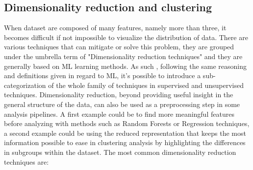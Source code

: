\subsection{Dimensionality reduction and clustering}
When dataset are composed of many features, namely more than three, it becomes difficult if not impossible to visualize the distribution of data. There are various techniques that can mitigate or solve this problem, they are grouped under the umbrella term of "Dimensionality reduction techniques" and they are generally based on ML learning methods. As such , following the same reasoning and definitions given in regard to ML, it's possible to introduce a sub-categorization of the whole family of techniques in supervised and unsupervised techniques. Dimensionality reduction, beyond providing useful insight in the general structure of the data, can also be used as a preprocessing step in some analysis pipelines. A first example could be to find more meaningful features before analyzing with methods such as Random Forests or Regression techniques, a second example could be using the reduced representation that keeps the most information possible to ease in clustering analysis by highlighting the differences in subgroups within the dataset. The most common dimensionality reduction techniques are:

